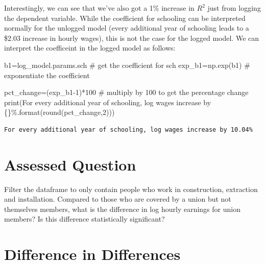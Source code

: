 \documentclass[
  letterpaper,
  DIV=11,
  numbers=noendperiod]{scrreprt}
\newenvironment{Shaded}{\begin{snugshade}}{\end{snugshade}}
\newcommand{\BuiltInTok}[1]{\textcolor[rgb]{0.00,0.23,0.31}{#1}}
\newcommand{\CommentTok}[1]{\textcolor[rgb]{0.37,0.37,0.37}{#1}}
\newcommand{\DecValTok}[1]{\textcolor[rgb]{0.68,0.00,0.00}{#1}}
\newcommand{\NormalTok}[1]{\textcolor[rgb]{0.00,0.23,0.31}{#1}}
\newcommand{\OperatorTok}[1]{\textcolor[rgb]{0.37,0.37,0.37}{#1}}
\newcommand{\SpecialCharTok}[1]{\textcolor[rgb]{0.37,0.37,0.37}{#1}}
\newcommand{\StringTok}[1]{\textcolor[rgb]{0.13,0.47,0.30}{#1}}
\begin{document}
Interestingly, we can see that we've also got a 1\% increase in \(R^2\)
just from logging the dependent variable. While the coefficient for
schooling can be interpreted normally for the unlogged model (every
additional year of schooling leads to a \$2.03 increase in hourly
wages), this is not the case for the logged model. We can interpret the
coefficeint in the logged model as follows:

\begin{Shaded}
\begin{Highlighting}[]
\NormalTok{b1}\OperatorTok{=}\NormalTok{log\_model.params.sch }\CommentTok{\# get the coefficient for sch}
\NormalTok{exp\_b1}\OperatorTok{=}\NormalTok{np.exp(b1) }\CommentTok{\# exponentiate the coefficient}

\NormalTok{pct\_change}\OperatorTok{=}\NormalTok{(exp\_b1}\OperatorTok{{-}}\DecValTok{1}\NormalTok{)}\OperatorTok{*}\DecValTok{100} \CommentTok{\# multiply by 100 to get the percentage change}
\BuiltInTok{print}\NormalTok{(}\StringTok{\textquotesingle{}For every additional year of schooling, log wages increase by }\SpecialCharTok{\{\}}\StringTok{\%\textquotesingle{}}\NormalTok{.}\BuiltInTok{format}\NormalTok{(}\BuiltInTok{round}\NormalTok{(pct\_change,}\DecValTok{2}\NormalTok{)))}
\end{Highlighting}
\end{Shaded}

\begin{verbatim}
For every additional year of schooling, log wages increase by 10.04%
\end{verbatim}


\hypertarget{assessed-question-1}{%
\chapter{Assessed Question}\label{assessed-question-1}}

Filter the dataframe to only contain people who work in construction,
extraction and installation. Compared to those who are covered by a
union but not themselves members, what is the difference in log hourly
earnings for union members? Is this difference statistically
significant?


\hypertarget{difference-in-differences}{%
\chapter{Difference in Differences}\label{difference-in-differences}}
\end{document}

